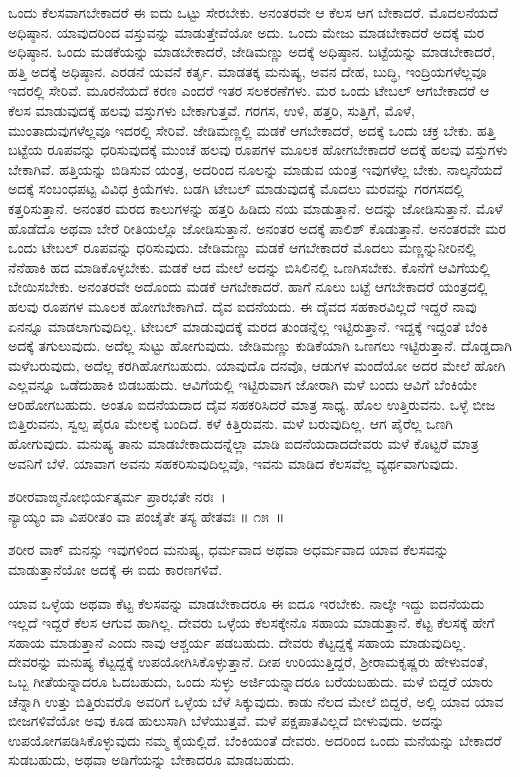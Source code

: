 ಒಂದು ಕೆಲಸವಾಗಬೇಕಾದರೆ ಈ ಐದು ಒಟ್ಟು ಸೇರಬೇಕು. ಅನಂತರವೇ ಆ ಕೆಲಸ ಆಗ ಬೇಕಾದರೆ. ಮೊದಲನೆಯದೆ ಅಧಿಷ್ಠಾನ. ಯಾವುದರಿಂದ ವಸ್ತುವನ್ನು ಮಾಡುತ್ತೇವೆಯೋ ಅದು. ಒಂದು ಮೇಜು ಮಾಡಬೇಕಾದರೆ ಅದಕ್ಕೆ ಮರ ಅಧಿಷ್ಠಾನ. ಒಂದು ಮಡಕೆಯನ್ನು ಮಾಡಬೇಕಾದರೆ, ಜೇಡಿಮಣ್ಣು ಅದಕ್ಕೆ ಅಧಿಷ್ಠಾನ. ಬಟ್ಟೆಯನ್ನು ಮಾಡಬೇಕಾದರೆ, ಹತ್ತಿ ಅದಕ್ಕೆ ಅಧಿಷ್ಠಾನ. ಎರಡನೆ ಯವನೆ ಕರ್ತೃ. ಮಾಡತಕ್ಕ ಮನುಷ್ಯ, ಅವನ ದೇಹ, ಬುದ್ಧಿ, ಇಂದ್ರಿಯಗಳೆಲ್ಲವೂ ಇದರಲ್ಲಿ ಸೇರಿವೆ. ಮೂರನೆಯದೆ ಕರಣ ಎಂದರೆ ಇತರ ಸಲಕರಣೆಗಳು. ಮರ ಒಂದು ಟೇಬಲ್ ಆಗಬೇಕಾದರೆ ಆ ಕೆಲಸ ಮಾಡುವುದಕ್ಕೆ ಹಲವು ವಸ್ತುಗಳು ಬೇಕಾಗುತ್ತವೆ. ಗರಗಸ, ಉಳಿ, ಹತ್ತರಿ, ಸುತ್ತಿಗೆ, ಮೊಳೆ, ಮುಂತಾದುವುಗಳೆಲ್ಲವೂ ಇದರಲ್ಲಿ ಸೇರಿವೆ. ಜೇಡಿಮಣ್ಣಲ್ಲಿ ಮಡಕೆ ಆಗಬೇಕಾದರೆ, ಅದಕ್ಕೆ ಒಂದು ಚಕ್ರ ಬೇಕು. ಹತ್ತಿ ಬಟ್ಟೆಯ ರೂಪವನ್ನು ಧರಿಸುವುದಕ್ಕೆ ಮುಂಚೆ ಹಲವು ರೂಪಗಳ ಮೂಲಕ ಹೋಗಬೇಕಾದರೆ ಅದಕ್ಕೆ ಹಲವು ವಸ್ತುಗಳು ಬೇಕಾಗಿವೆ. ಹತ್ತಿಯನ್ನು ಬಿಡಿಸುವ ಯಂತ್ರ, ಅದರಿಂದ ನೂಲನ್ನು ಮಾಡುವ ಯಂತ್ರ ಇವುಗಳೆಲ್ಲ ಬೇಕು. ನಾಲ್ಕನೆಯದೆ ಅದಕ್ಕೆ ಸಂಬಂಧಪಟ್ಟ ವಿವಿಧ ಕ್ರಿಯೆಗಳು. ಬಡಗಿ ಟೇಬಲ್ ಮಾಡುವುದಕ್ಕೆ ಮೊದಲು ಮರವನ್ನು ಗರಗಸದಲ್ಲಿ ಕತ್ತರಿಸುತ್ತಾನೆ. ಅನಂತರ ಮರದ ಕಾಲುಗಳನ್ನು ಹತ್ತರಿ ಹಿಡಿದು ನಯ ಮಾಡುತ್ತಾನೆ. ಅದನ್ನು ಜೋಡಿಸುತ್ತಾನೆ. ಮೊಳೆ ಹೊಡೆದೊ ಅಥವಾ ಬೇರೆ ರೀತಿಯಲ್ಲೊ ಜೋಡಿಸುತ್ತಾನೆ. ಅನಂತರ ಅದಕ್ಕೆ ಪಾಲಿಶ್ ಕೊಡುತ್ತಾನೆ. ಅನಂತರವೇ ಮರ ಒಂದು ಟೇಬಲ್ ರೂಪವನ್ನು ಧರಿಸುವುದು. ಜೇಡಿಮಣ್ಣು ಮಡಕೆ ಆಗಬೇಕಾದರೆ ಮೊದಲು ಮಣ್ಣನ್ನು\break ನೀರಿನಲ್ಲಿ ನೆನೆಹಾಕಿ ಹದ ಮಾಡಿಕೊಳ್ಳಬೇಕು. ಮಡಕೆ ಆದ ಮೇಲೆ ಅದನ್ನು ಬಿಸಿಲಿನಲ್ಲಿ ಒಣಗಿಸಬೇಕು. ಕೊನೆಗೆ ಆವಿಗೆಯಲ್ಲಿ ಬೇಯಿಸಬೇಕು. ಅನಂತರವೇ ಅದೊಂದು ಮಡಕೆ ಆಗಬೇಕಾದರೆ. ಹಾಗೆ ನೂಲು ಬಟ್ಟೆ ಆಗಬೇಕಾದರೆ ಯಂತ್ರದಲ್ಲಿ ಹಲವು ರೂಪಗಳ ಮೂಲಕ ಹೋಗಬೇಕಾಗಿದೆ. ದೈವ ಐದನೆಯದು. ಈ ದೈವದ ಸಹಕಾರವಿಲ್ಲದೆ ಇದ್ದರೆ ನಾವು ಏನನ್ನೂ ಮಾಡಲಾಗುವುದಿಲ್ಲ. ಟೇಬಲ್ ಮಾಡುವುದಕ್ಕೆ ಮರದ ತುಂಡನ್ನೆಲ್ಲ ಇಟ್ಟಿರುತ್ತಾನೆ. ಇದ್ದಕ್ಕೆ ಇದ್ದಂತೆ ಬೆಂಕಿ ಅದಕ್ಕೆ ತಗುಲುವುದು. ಅದೆಲ್ಲ ಸುಟ್ಟು ಹೋಗುವುದು. ಜೇಡಿಮಣ್ಣು ಕುಡಿಕೆಯಾಗಿ ಒಣಗಲು ಇಟ್ಟಿರುತ್ತಾನೆ. ದೊಡ್ಡದಾಗಿ ಮಳೆಬರುವುದು, ಅದೆಲ್ಲ ಕರಗಿಹೋಗಬಹುದು. ಯಾವುದೊ ದನವೊ, ಆಡುಗಳ ಮಂದೆಯೋ ಅದರ ಮೇಲೆ ಹೋಗಿ ಎಲ್ಲವನ್ನೂ ಒಡೆದುಹಾಕಿ ಬಿಡಬಹುದು. ಆವಿಗೆಯಲ್ಲಿ ಇಟ್ಟಿರುವಾಗ ಜೋರಾಗಿ ಮಳೆ ಬಂದು ಆವಿಗೆ ಬೆಂಕಿಯೇ ಆರಿಹೋಗಬಹುದು. ಅಂತೂ ಐದನೆಯದಾದ ದೈವ ಸಹಕರಿಸಿದರೆ ಮಾತ್ರ ಸಾಧ್ಯ. ಹೊಲ ಉತ್ತಿರುವನು. ಒಳ್ಳೆ ಬೀಜ ಬಿತ್ತಿರುವನು, ಸ್ವಲ್ಪ ಪೈರೂ ಮೇಲಕ್ಕೆ ಬಂದಿದೆ. ಕಳೆ ಕಿತ್ತಿರುವನು. ಮಳೆ ಬರುವುದಿಲ್ಲ. ಆಗ ಪೈರೆಲ್ಲ ಒಣಗಿ ಹೋಗುವುದು. ಮನುಷ್ಯ ತಾನು ಮಾಡಬೇಕಾದುದನ್ನೆಲ್ಲಾ ಮಾಡಿ ಐದನೆಯದಾದ\break ದೇವರು ಮಳೆ ಕೊಟ್ಟರೆ ಮಾತ್ರ ಅವನಿಗೆ ಬೆಳೆ. ಯಾವಾಗ ಅವನು ಸಹಕರಿಸುವುದಿಲ್ಲವೊ, ಇವನು ಮಾಡಿದ ಕೆಲಸವೆಲ್ಲ ವ್ಯರ್ಥವಾಗುವುದು.

\begin{shloka}
ಶರೀರವಾಙ್ಮನೋಭಿರ್ಯತ್ಕರ್ಮ ಪ್ರಾರಭತೇ ನರಃ~।\\ನ್ಯಾಯ್ಯಂ ವಾ ವಿಪರೀತಂ ವಾ ಪಂಚೈತೇ ತಸ್ಯ ಹೇತವಃ \hfill॥ ೧೫~॥
\end{shloka}

\begin{artha}
ಶರೀರ ವಾಕ್ ಮನಸ್ಸು ಇವುಗಳಿಂದ ಮನುಷ್ಯ, ಧರ್ಮವಾದ ಅಥವಾ ಅಧರ್ಮವಾದ ಯಾವ ಕೆಲಸವನ್ನು ಮಾಡುತ್ತಾನೆಯೋ ಅದಕ್ಕೆ ಈ ಐದು ಕಾರಣಗಳಿವೆ.
\end{artha}

ಯಾವ ಒಳ್ಳೆಯ ಅಥವಾ ಕೆಟ್ಟ ಕೆಲಸವನ್ನು ಮಾಡಬೇಕಾದರೂ ಈ ಐದೂ ಇರಬೇಕು. ನಾಲ್ಕೇ ಇದ್ದು ಐದನೆಯದು ಇಲ್ಲದೆ ಇದ್ದರೆ ಕೆಲಸ ಆಗುವ ಹಾಗಿಲ್ಲ. ದೇವರು ಒಳ್ಳೆಯ ಕೆಲಸಕ್ಕೇನೊ ಸಹಾಯ ಮಾಡುತ್ತಾನೆ. ಕೆಟ್ಟ ಕೆಲಸಕ್ಕೆ ಹೇಗೆ ಸಹಾಯ ಮಾಡುತ್ತಾನೆ ಎಂದು ನಾವು ಆಶ್ಚರ್ಯ ಪಡಬಹುದು. ದೇವರು ಕೆಟ್ಟದ್ದಕ್ಕೆ ಸಹಾಯ ಮಾಡುವುದಿಲ್ಲ. ದೇವರನ್ನು ಮನುಷ್ಯ ಕೆಟ್ಟದ್ದಕ್ಕೆ ಉಪಯೋಗಿಸಿಕೊಳ್ಳುತ್ತಾನೆ. ದೀಪ ಉರಿಯುತ್ತಿದ್ದರೆ, ಶ‍್ರೀರಾಮಕೃಷ್ಣರು ಹೇಳುವಂತೆ, ಒಬ್ಬ ಗೀತೆಯನ್ನಾದರೂ ಓದಬಹುದು, ಒಂದು ಸುಳ್ಳು ಅರ್ಜಿಯನ್ನಾದರೂ ಬರೆಯಬಹುದು. ಮಳೆ ಬಿದ್ದರೆ ಯಾರು ಚೆನ್ನಾಗಿ ಉತ್ತು ಬಿತ್ತಿರುವರೊ ಅವರಿಗೆ ಒಳ್ಳೆಯ ಬೆಳೆ ಸಿಕ್ಕುವುದು. ಕಾಡು ನೆಲದ ಮೇಲೆ ಬಿದ್ದರೆ, ಅಲ್ಲಿ ಯಾವ ಯಾವ ಬೀಜಗಳಿವೆಯೋ ಅವು ಕೂಡ ಹುಲುಸಾಗಿ ಬೆಳೆಯುತ್ತವೆ. ಮಳೆ ಪಕ್ಷಪಾತವಿಲ್ಲದೆ ಬೀಳುವುದು. ಅದನ್ನು ಉಪಯೋಗಪಡಿಸಿಕೊಳ್ಳುವುದು ನಮ್ಮ ಕೈಯಲ್ಲಿದೆ. ಬೆಂಕಿಯಂತೆ ದೇವರು. ಅದರಿಂದ ಒಂದು ಮನೆಯನ್ನು ಬೇಕಾದರೆ ಸುಡಬಹುದು, ಅಥವಾ ಅಡಿಗೆಯನ್ನು ಬೇಕಾದರೂ ಮಾಡಬಹುದು.

